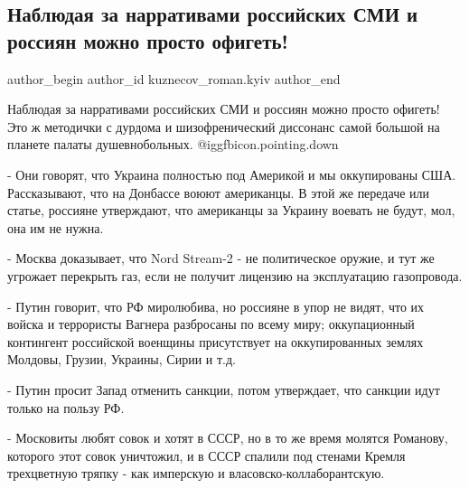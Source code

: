  
 
 
 
 
 
\subsection{Наблюдая за нарративами российских СМИ и россиян можно просто офигеть!}
\label{sec:14_01_2022.fb.kuznecov_roman.kyiv.1.rossia_narrativy}
 
\ifcmt
 author_begin
   author_id kuznecov_roman.kyiv
 author_end
\fi

Наблюдая за нарративами российских СМИ и россиян можно просто офигеть! Это ж
методички с дурдома и шизофренический диссонанс самой большой на планете палаты
душевнобольных.  @igg{fbicon.pointing.down} 

- Они говорят, что Украина полностью под Америкой и мы оккупированы США.
Рассказывают, что на Донбассе воюют американцы. В этой же передаче или статье,
россияне утверждают, что американцы за Украину воевать не будут, мол, она им не
нужна.


- Москва доказывает, что Nord Stream-2 - не политическое оружие, и тут же
угрожает перекрыть газ, если не получит лицензию на эксплуатацию газопровода.

- Путин говорит, что РФ миролюбива, но россияне в упор не видят, что их войска
и террористы Вагнера разбросаны по всему миру; оккупационный контингент
российской военщины присутствует на оккупированных землях Молдовы, Грузии,
Украины, Сирии и т.д.

- Путин просит Запад отменить санкции, потом утверждает, что санкции идут
только на пользу РФ.

- Московиты любят совок и хотят в СССР, но в то же время молятся Романову,
которого этот совок уничтожил, и в СССР спалили под стенами Кремля трехцветную
тряпку - как имперскую и власовско-коллаборантскую.

